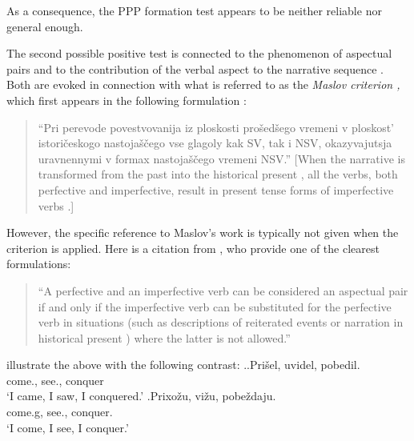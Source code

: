 As a consequence, the PPP formation test appears to be neither reliable nor general enough.

The second possible positive test is connected to the phenomenon of aspectual pairs  and to the contribution of the verbal aspect to the narrative sequence . Both are evoked in connection with what is referred to as the \textit{Maslov criterion ,} which first appears in the following formulation \citep[][76--77]{Maslov:04}: 
\begin{quote}
``Pri perevode povestvovanija iz ploskosti pro\v{s}ed\v{s}ego vremeni v ploskost' istori\v{c}eskogo nastoja\v{s}\v{c}ego vse glagoly kak SV, tak i NSV, okazyvajutsja uravnennymi v formax nastoja\v{s}\v{c}ego vremeni NSV.'' [When the narrative is transformed from the past  into the historical present , all the verbs, both perfective and imperfective, result in present tense forms of imperfective verbs .] 
\end{quote}
However, the specific reference to Maslov's work is typically not given when the criterion is applied. Here is a citation from \citet[1]{Mikaelian:07}, who provide one of the clearest formulations:

\begin{quote}
``A perfective and an imperfective verb  can be considered an aspectual pair  if and only if the imperfective verb  can be substituted for the perfective verb  in situations (such as descriptions of reiterated events or narration in historical present ) where the latter is not allowed.'' 
\end{quote}

\citet{Mikaelian:07} illustrate the above with the following contrast: 
\ex.\label{maslov}\ag.\label{maslov1}Pri\v{s}el\textsuperscript{\PF}, uvidel\textsuperscript{\PF}, pobedil.\textsuperscript{\PF}\\
come., see., conquer\\
\trans `I came, I saw, I conquered.'
\bg.\label{maslov2}Prixo\v{z}u\textsuperscript{\IPF}, vi\v{z}u\textsuperscript{\IPF}, pobe\v{z}daju.\textsuperscript{\IPF}\\
come.g, see., conquer.\\
\trans `I come, I see, I conquer.'

